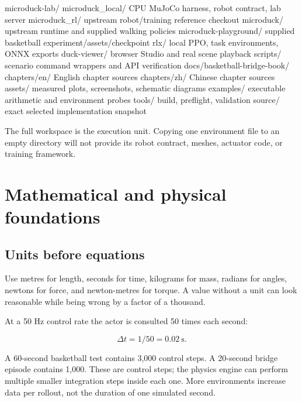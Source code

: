 \documentclass[
  american,
  11pt,
  letterpaper,
]{article}
\newenvironment{Shaded}{\begin{snugshade}}{\end{snugshade}}
\newcommand{\NormalTok}[1]{#1}
\renewenvironment{Shaded}{\par\smallskip}{\par\smallskip}
\begin{document}
\begin{Shaded}
\begin{Highlighting}[]
\NormalTok{microduck{-}lab/}
\NormalTok{  microduck\_local/       CPU MuJoCo harness, robot contract, lab server}
\NormalTok{  microduck\_rl/          upstream robot/training reference checkout}
\NormalTok{  microduck/             upstream runtime and supplied walking policies}
\NormalTok{  microduck{-}playground/  supplied basketball experiment/assets/checkpoint}
\NormalTok{  rlx/                  local PPO, task environments, ONNX exports}
\NormalTok{  duck{-}viewer/           browser Studio and real scene playback}
\NormalTok{  scripts/              scenario command wrappers and API verification}
\NormalTok{  docs/basketball{-}bridge{-}book/}
\NormalTok{    chapters/en/        English chapter sources}
\NormalTok{    chapters/zh/        Chinese chapter sources}
\NormalTok{    assets/             measured plots, screenshots, schematic diagrams}
\NormalTok{    examples/           executable arithmetic and environment probes}
\NormalTok{    tools/              build, preflight, validation}
\NormalTok{    source/             exact selected implementation snapshot}
\end{Highlighting}
\end{Shaded}

The full workspace is the execution unit. Copying one environment file
to an empty directory will not provide its robot contract, meshes,
actuator code, or training framework.

\section{Mathematical and physical
foundations}\label{mathematical-and-physical-foundations}

\subsection{Units before equations}\label{units-before-equations}

Use metres for length, seconds for time, kilograms for mass, radians for
angles, newtons for force, and newton-metres for torque. A value without
a unit can look reasonable while being wrong by a factor of a thousand.

At a 50 Hz control rate the actor is consulted 50 times each second:

\[\Delta t = 1/50 = 0.02\ \mathrm{s}.\]

A 60-second basketball test contains 3,000 control steps. A 20-second
bridge episode contains 1,000. These are control steps; the physics
engine can perform multiple smaller integration steps inside each one.
More environments increase data per rollout, not the duration of one
simulated second.
\end{document}
